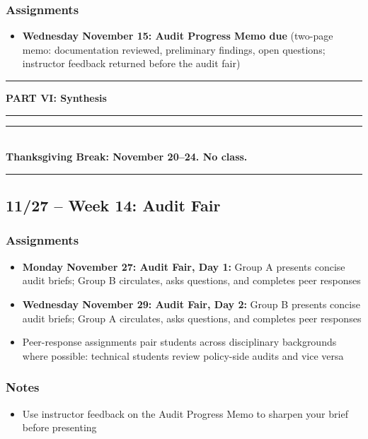 \documentclass[12pt]{article}
\begin{document}
    \subsubsection*{Assignments}
        \begin{itemize}
            \item \textbf{Wednesday November 15: Audit Progress Memo due} (two-page memo: documentation reviewed, preliminary findings, open questions; instructor feedback returned before the audit fair)
        \end{itemize}

\bigskip
\noindent\rule{\textwidth}{0.6pt}
\begin{center}\textbf{PART VI: Synthesis}\end{center}
\noindent\rule{\textwidth}{0.6pt}

\begin{center}
\vspace{0.5em}
\noindent\rule{0.5\textwidth}{0.4pt}\\[0.25em]
\textbf{Thanksgiving Break: November 20--24. No class.}\\[0.25em]
\noindent\rule{0.5\textwidth}{0.4pt}
\vspace{0.5em}
\end{center}

\subsection*{11/27 -- Week 14: Audit Fair}
    \subsubsection*{Assignments}
        \begin{itemize}
            \item \textbf{Monday November 27: Audit Fair, Day 1:} Group A presents concise audit briefs; Group B circulates, asks questions, and completes peer responses
            \item \textbf{Wednesday November 29: Audit Fair, Day 2:} Group B presents concise audit briefs; Group A circulates, asks questions, and completes peer responses
            \item Peer-response assignments pair students across disciplinary backgrounds where possible: technical students review policy-side audits and vice versa
        \end{itemize}
    \subsubsection*{Notes}
        \begin{itemize}
            \item Use instructor feedback on the Audit Progress Memo to sharpen your brief before presenting
        \end{itemize}
\end{document}
